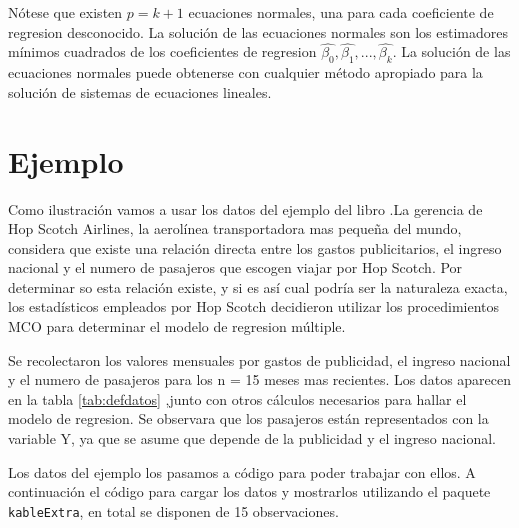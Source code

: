 \documentclass[
]{book}
\begin{document}
Nótese que existen \(p = k +1\) ecuaciones normales, una para cada coeficiente de regresion desconocido. La solución de las ecuaciones normales son los estimadores mínimos cuadrados de los coeficientes de regresion \(\hat{\beta_{0}},\hat{\beta_{1}},...,\hat{\beta_{k}}\). La solución de las ecuaciones normales puede obtenerse con cualquier método apropiado para la solución de sistemas de ecuaciones lineales.

\hypertarget{ejemplo}{%
\chapter*{Ejemplo}\label{ejemplo}}

Como ilustración vamos a usar los datos del ejemplo del libro \citet{webster2000estadistica} .La gerencia de Hop Scotch Airlines, la aerolínea transportadora mas pequeña del mundo, considera que existe una relación directa entre los gastos publicitarios, el ingreso nacional y el numero de pasajeros que escogen viajar por Hop Scotch. Por determinar so esta relación existe, y si es así cual podría ser la naturaleza exacta, los estadísticos empleados por Hop Scotch decidieron utilizar los procedimientos MCO para determinar el modelo de regresion múltiple.

Se recolectaron los valores mensuales por gastos de publicidad, el ingreso nacional y el numero de pasajeros para los n = 15 meses mas recientes. Los datos aparecen en la tabla \ref{tab:defdatos} ,junto con otros cálculos necesarios para hallar el modelo de regresion. Se observara que los pasajeros están representados con la variable Y, ya que se asume que depende de la publicidad y el ingreso nacional.

Los datos del ejemplo los pasamos a código para poder trabajar con ellos. A continuación el código para cargar los datos y mostrarlos utilizando el paquete \texttt{kableExtra}, en total se disponen de 15 observaciones.
\end{document}

